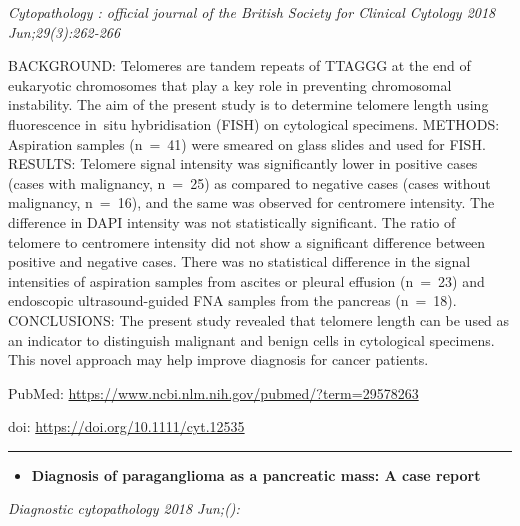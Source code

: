 \documentclass[]{article}
\providecommand{\tightlist}{%
  \setlength{\itemsep}{0pt}\setlength{\parskip}{0pt}}
\begin{document}
\emph{Cytopathology : official journal of the British Society for
Clinical Cytology 2018 Jun;29(3):262-266}

BACKGROUND: Telomeres are tandem repeats of TTAGGG at the end of
eukaryotic chromosomes that play a key role in preventing chromosomal
instability. The aim of the present study is to determine telomere
length using fluorescence in~situ hybridisation (FISH) on cytological
specimens. METHODS: Aspiration samples (n~=~41) were smeared on glass
slides and used for FISH. RESULTS: Telomere signal intensity was
significantly lower in positive cases (cases with malignancy, n~=~25) as
compared to negative cases (cases without malignancy, n~=~16), and the
same was observed for centromere intensity. The difference in DAPI
intensity was not statistically significant. The ratio of telomere to
centromere intensity did not show a significant difference between
positive and negative cases. There was no statistical difference in the
signal intensities of aspiration samples from ascites or pleural
effusion (n~=~23) and endoscopic ultrasound-guided FNA samples from the
pancreas (n~=~18). CONCLUSIONS: The present study revealed that telomere
length can be used as an indicator to distinguish malignant and benign
cells in cytological specimens. This novel approach may help improve
diagnosis for cancer patients.

PubMed: \url{https://www.ncbi.nlm.nih.gov/pubmed/?term=29578263}

doi: \url{https://doi.org/10.1111/cyt.12535}

{}

{}

\begin{center}\rule{0.5\linewidth}{\linethickness}\end{center}

\begin{itemize}
\tightlist
\item
  \textbf{Diagnosis of paraganglioma as a pancreatic mass: A case
  report}
\end{itemize}

\emph{Diagnostic cytopathology 2018 Jun;():}
\end{document}
